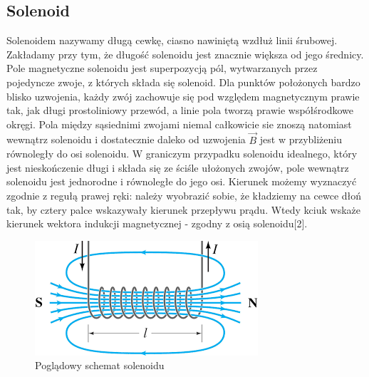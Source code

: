 \documentclass[paper=a4, fontsize=12pt]{scrartcl}
\begin{document}
\subsection{Solenoid}
Solenoidem nazywamy długą cewkę, ciasno nawiniętą wzdłuż linii śrubowej. Zakładamy przy tym, że długość solenoidu jest znacznie większa od jego średnicy. Pole magnetyczne solenoidu jest superpozycją pól, wytwarzanych przez pojedyncze zwoje, z których składa się solenoid. Dla punktów położonych bardzo blisko uzwojenia, każdy zwój zachowuje się pod względem magnetycznym prawie tak, jak długi prostoliniowy przewód, a linie pola tworzą prawie współśrodkowe okręgi.
Pola między sąsiednimi zwojami niemal całkowicie sie znoszą natomiast wewnątrz solenoidu i dostatecznie daleko od uzwojenia $\vec{B}$ jest w przybliżeniu równoległy do osi solenoidu. W graniczym przypadku solenoidu idealnego, który jest nieskończenie długi i składa się ze ściśle ułożonych zwojów, pole wewnątrz solenoidu jest jednorodne i równoległe do jego osi. Kierunek możemy wyznaczyć zgodnie z regułą prawej ręki: należy wyobrazić sobie, że kładziemy na cewce dłoń tak, by cztery palce wskazywały kierunek przepływu prądu. Wtedy kciuk wskaże kierunek wektora indukcji magnetycznej - zgodny z osią solenoidu[2]. 
\begin{figure}[h]
\centering
\includegraphics[width=0.5\linewidth]{sl}
\caption{Poglądowy schemat solenoidu}
\label{fig:sl}
\end{figure}
\end{document}
